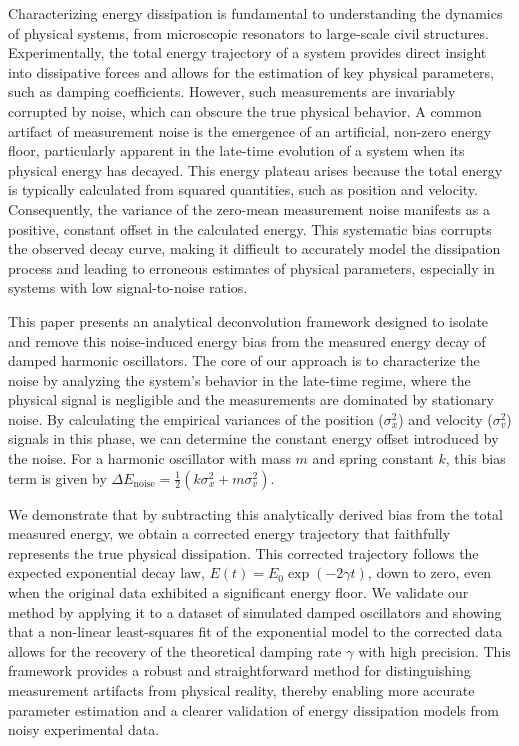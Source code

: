 \documentclass[]{article}
\begin{document}
Characterizing energy dissipation is fundamental to understanding the dynamics of physical systems, from microscopic resonators to large-scale civil structures. Experimentally, the total energy trajectory of a system provides direct insight into dissipative forces and allows for the estimation of key physical parameters, such as damping coefficients. However, such measurements are invariably corrupted by noise, which can obscure the true physical behavior. A common artifact of measurement noise is the emergence of an artificial, non-zero energy floor, particularly apparent in the late-time evolution of a system when its physical energy has decayed. This energy plateau arises because the total energy is typically calculated from squared quantities, such as position and velocity. Consequently, the variance of the zero-mean measurement noise manifests as a positive, constant offset in the calculated energy. This systematic bias corrupts the observed decay curve, making it difficult to accurately model the dissipation process and leading to erroneous estimates of physical parameters, especially in systems with low signal-to-noise ratios.

This paper presents an analytical deconvolution framework designed to isolate and remove this noise-induced energy bias from the measured energy decay of damped harmonic oscillators. The core of our approach is to characterize the noise by analyzing the system's behavior in the late-time regime, where the physical signal is negligible and the measurements are dominated by stationary noise. By calculating the empirical variances of the position ($\sigma_x^2$) and velocity ($\sigma_v^2$) signals in this phase, we can determine the constant energy offset introduced by the noise. For a harmonic oscillator with mass $m$ and spring constant $k$, this bias term is given by $\Delta E_{\text{noise}} = \frac{1}{2}(k\sigma_x^2 + m\sigma_v^2)$.

We demonstrate that by subtracting this analytically derived bias from the total measured energy, we obtain a corrected energy trajectory that faithfully represents the true physical dissipation. This corrected trajectory follows the expected exponential decay law, $E(t) = E_0 \exp(-2\gamma t)$, down to zero, even when the original data exhibited a significant energy floor. We validate our method by applying it to a dataset of simulated damped oscillators and showing that a non-linear least-squares fit of the exponential model to the corrected data allows for the recovery of the theoretical damping rate $\gamma$ with high precision. This framework provides a robust and straightforward method for distinguishing measurement artifacts from physical reality, thereby enabling more accurate parameter estimation and a clearer validation of energy dissipation models from noisy experimental data.
\end{document}
